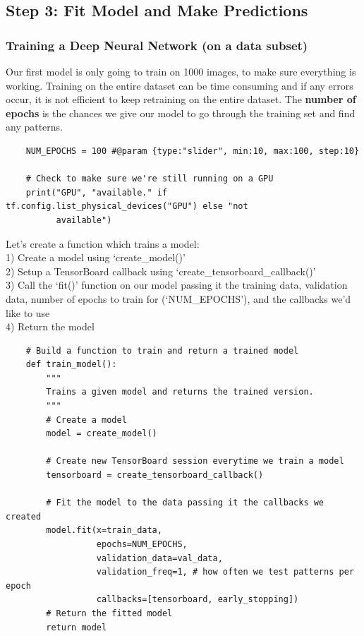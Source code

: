 \documentclass[11pt, a4paper]{article}
\begin{document}
\begin{spacing}{1.1}
	\subsection{Step 3: Fit Model and Make Predictions}
	\subsubsection{Training a Deep Neural Network (on a data subset)}	
	Our first model is only going to train on 1000 images, to make sure everything is working. Training on the entire dataset can be time consuming and if any errors occur, it is not efficient to keep retraining on the entire dataset. The \textbf{number of epochs} is the chances we give our model to go through the training set and find any patterns. 
	\begin{lstlisting}
	NUM_EPOCHS = 100 #@param {type:"slider", min:10, max:100, step:10}
	
	# Check to make sure we're still running on a GPU
	print("GPU", "available." if tf.config.list_physical_devices("GPU") else "not 
	      available") \end{lstlisting} \vspace*{1mm}
	Let's create a function which trains a model: \\	
	\hspace*{2mm} 1) Create a model using `create\_model()' \\
	\hspace*{2mm} 2) Setup a TensorBoard callback using `create\_tensorboard\_callback()' \\
	\hspace*{2mm} 3) Call the `fit()' function on our model passing it the training data, validation data, number of epochs \hspace*{7mm} to train for (`NUM\_EPOCHS'), and the callbacks we'd like to use \\
	\hspace*{2mm} 4) Return the model
	\begin{lstlisting}
	# Build a function to train and return a trained model
	def train_model():
		"""
		Trains a given model and returns the trained version.
		"""
		# Create a model
		model = create_model()
		
		# Create new TensorBoard session everytime we train a model
		tensorboard = create_tensorboard_callback()
		
		# Fit the model to the data passing it the callbacks we created
		model.fit(x=train_data,
		          epochs=NUM_EPOCHS,
		          validation_data=val_data,
		          validation_freq=1, # how often we test patterns per epoch
		          callbacks=[tensorboard, early_stopping])
		# Return the fitted model
		return model
	

\end{lstlisting}
\end{spacing}
\end{document}
